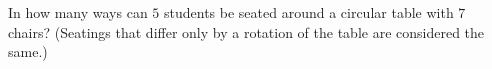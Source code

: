 In how many ways can $5$ students be seated around a circular table with $7$ chairs? (Seatings that differ only by a rotation of the table are considered the same.)
